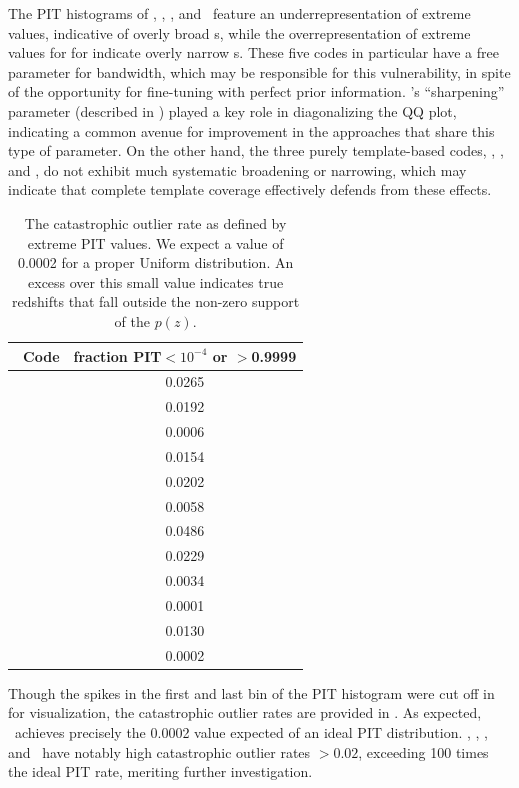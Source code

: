 The PIT histograms of \delight, \cmnn, \skynet, and \tpz\ feature an underrepresentation of extreme values, indicative of overly broad \pzpdf s, while the overrepresentation of extreme values for for \metaphor indicate overly narrow \pzpdf s.
These five codes in particular have a free parameter for bandwidth, which may be responsible for this vulnerability, in spite of the opportunity for fine-tuning with perfect prior information.
\flexzboost's ``sharpening'' parameter (described in ) played a key role in diagonalizing the QQ plot, indicating a common avenue for improvement in the approaches that share this type of parameter.
On the other hand, the three purely template-based codes, \bpz, \eazy, and \lephare, do not exhibit much systematic broadening or narrowing, which may indicate that complete template coverage effectively defends from these effects.

\begin{table}
	\setlength{\tabcolsep}{2pt}
	\centering
	\caption{The catastrophic outlier rate as defined by extreme PIT values.
		We expect a value of 0.0002 for a proper Uniform distribution.
		An excess over this small value indicates true redshifts that fall outside the non-zero support of the $p(z)$.}
	\begin{tabular}{lc}
		\hline
		\hline
		\Pz\ Code & fraction PIT$<10^{-4}$ or $>$0.9999\\
		\hline
		\annz       & 0.0265\\
		\bpz        & 0.0192\\
		\delight    & 0.0006\\
		\eazy       & 0.0154\\
		\flexzboost & 0.0202\\
		\gpz        & 0.0058\\
		\lephare    & 0.0486\\
		\metaphor   & 0.0229\\
		\cmnn       & 0.0034\\
		\skynet     & 0.0001\\
		\tpz        & 0.0130\\
		\hline
		\trainz     & 0.0002\\
	\end{tabular}
\end{table}

Though the spikes in the first and last bin of the PIT histogram were cut off in  for visualization, the catastrophic outlier rates are provided in .
As expected, \trainz\ achieves precisely the 0.0002 value expected of an ideal PIT distribution.
\annz, \flexzboost, \lephare, and \metaphor\ have notably high catastrophic outlier rates $> 0.02$, exceeding 100 times the ideal PIT rate, meriting further investigation.

